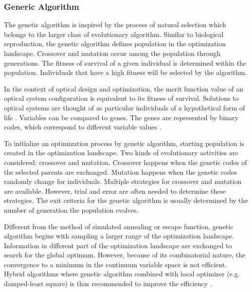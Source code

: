 \subsubsection{Generic Algorithm}

The genetic algorithm is inspired by the process of natural selection which belongs to the larger class of evolutionary algorithm. Similar to biological reproduction, the genetic algorithm defines population in the optimization landscape. Crossover and mutation occur among the population through generations. The fitness of survival of a given individual is determined within the population. Individuals that have a high fitness will be selected by the algorithm.

In the context of optical design and optimization, the merit function value of an optical system configuration is equivalent to its fitness of survival. Solutions to optical systems are thought of as particular individuals of a hypothetical form of life \cite{Moore1999}. Variables can be compared to genes. The genes are represented by binary codes, which correspond to different variable values \cite{GAreview2018}. 

To initialize an optimization process by genetic algorithm, starting population is created in the optimization landscape. Two kinds of evolutionary activities are considered: crossover and mutation. Crossover happens when the genetic codes of the selected parents are exchanged. Mutation happens when the genetic codes randomly change for individuals. Multiple strategies for crossover and mutation are available. However, trial and error are often needed to determine these strategies. The exit criteria for the genetic algorithm is usually determined by the number of generation the population evolves. 

Different from the method of simulated annealing or escape function, genetic algorithm begins with sampling a larger range of the optimization landscape. Information in different part of the optimization landscape are exchanged to search for the global optimum. However, because of its combinatorial nature, the convergence to a minimum in the continuum variable space is not efficient. Hybrid algorithms where genetic algorithm combined with local optimizer (e.g. damped-least square) is thus recommended to improve the efficiency \cite{Moore1999}.

